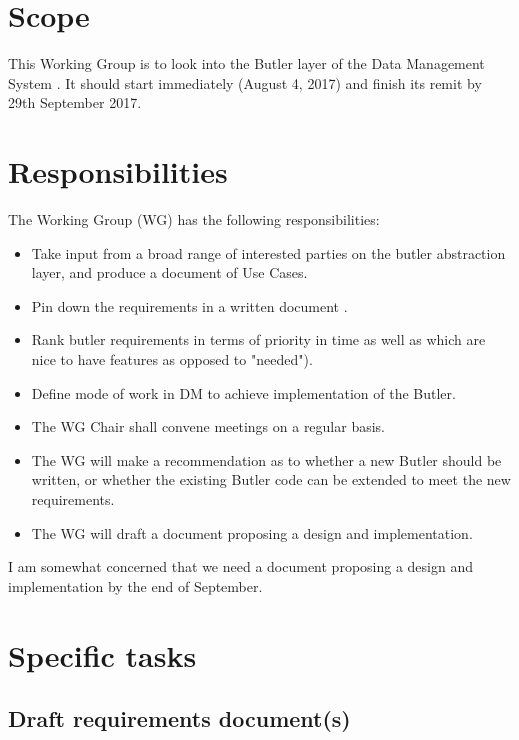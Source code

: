 \section{Scope}

This Working Group is to look into the Butler layer of the Data Management System .
It should start immediately (August 4, 2017) and finish its remit by 29th September 2017.


\section{Responsibilities}

The Working Group (WG) has the following responsibilities:

\begin{itemize}
 \item Take input from a broad range of interested parties on the butler abstraction layer, and produce a document of Use Cases.
 \item Pin down the requirements in a written document .
 \item Rank butler requirements in terms of priority in time as well as which are nice to have features as opposed to "needed").
 \item Define mode of work in DM to achieve implementation of the Butler.
 \item The WG Chair shall convene meetings on a regular basis.
 \item The WG will make a recommendation as to whether a new Butler should be written, or whether the existing Butler code can be extended to meet the new requirements.
 \item The WG will draft a document proposing a design and implementation.
\end{itemize}

\begin{draftnote}
  I am somewhat concerned that we need a document proposing a design and implementation by the end of September.
\end{draftnote}

\section{Specific tasks}

\subsection{Draft requirements document(s)}

